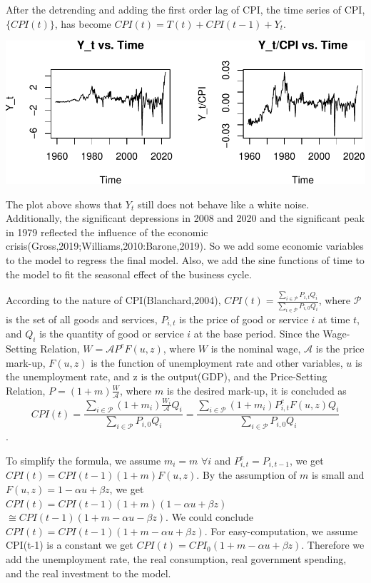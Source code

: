 \documentclass[
  man,floatsintext,
  man]{apa6}
\begin{document}
After the detrending and adding the first order lag of CPI, the time series of CPI, \(\{CPI(t)\}\), has become \(CPI(t) = T(t) + CPI(t-1) + Y_t\).

\includegraphics{stat429_group2_final_proj_files/figure-latex/unnamed-chunk-2-1.pdf}

The plot above shows that \(Y_t\) still does not behave like a white noise.
Additionally, the significant depressions in 2008 and 2020 and the significant peak in 1979 reflected the influence of the economic crisis(Gross,2019;Williams,2010:Barone,2019).
So we add some economic variables to the model to regress the final model.
Also, we add the sine functions of time to the model to fit the seasonal effect of the business cycle.

According to the nature of CPI(Blanchard,2004), \(CPI(t) = \frac{\sum_{i \in \mathcal{P}} P_{i,t} Q_i}{\sum_{i \in \mathcal{P}} P_{i,0} Q_i}\), where \(\mathcal{P}\) is the set of all goods and services, \(P_{i,t}\) is the price of good or service \(i\) at time \(t\), and \(Q_i\) is the quantity of good or service \(i\) at the base period.
Since the Wage-Setting Relation, \(W = \mathcal{A} P^e F(u,z)\), where \(W\) is the nominal wage, \(\mathcal{A}\) is the price mark-up, \(F(u,z)\) is the function of unemployment rate and other variables, \(u\) is the unemployment rate, and z is the output(GDP), and the Price-Setting Relation, \(P = (1+m)\frac{W}{\mathcal{A}}\), where \(m\) is the desired mark-up,
it is concluded as
\[CPI(t) = \frac{\sum_{i \in \mathcal{P}} (1+m_i) \frac{W_i}{\mathcal{A}} Q_i}{\sum_{i \in \mathcal{P}} P_{i,0} Q_i} = \frac{\sum_{i \in \mathcal{P}} (1+m_i) P_{i,t}^e F(u,z) Q_i}{\sum_{i \in \mathcal{P}} P_{i,0} Q_i}\].

To simplify the formula, we assume \(m_i = m \,\, \forall i\) and \(P_{i,t}^e = P_{i,t-1}\), we get \(CPI(t) = CPI(t-1) (1+m) F(u,z)\).
By the assumption of \(m\) is small and \(F(u,z) = 1 - \alpha u + \beta z\), we get \(CPI(t) = CPI(t-1) (1+m) (1 - \alpha u + \beta z)\) \(\cong CPI(t-1) ( 1 + m - \alpha u - \beta z)\).
We could conclude \(CPI(t)=CPI(t-1)(1 + m - \alpha u + \beta z)\).
For easy-computation, we assume CPI(t-1) is a constant we get \(CPI(t)=CPI_0(1 + m - \alpha u + \beta z)\).
Therefore we add the unemployment rate, the real consumption, real government spending, and the real investment to the model.
\end{document}
